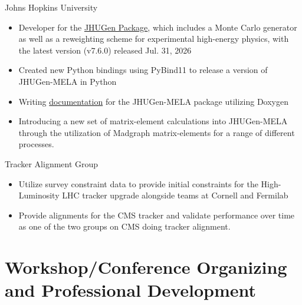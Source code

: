 \documentclass[11pt,english,sans,colorlinks=true,citecolor=black]{moderncv}
\begin{document}
    {Johns Hopkins University}
    {}{}{
        \begin{itemize}
            \item Developer for the \href{https://spin.pha.jhu.edu/}{JHUGen Package},
            which includes a Monte Carlo generator as well as a reweighting scheme
            for experimental high-energy physics, with the latest version
            (v7.6.0) released Jul. 31, 2026
            \item Created new Python bindings using PyBind11 to release a version of
            JHUGen-MELA in Python
            \item Writing \href{https://spin.pha.jhu.edu/MELA/}{documentation} for the JHUGen-MELA
            package utilizing Doxygen
            \item Introducing a new set of matrix-element calculations into JHUGen-MELA
            through the utilization of Madgraph matrix-elements for a range of different processes.
        \end{itemize}
    }

    {Tracker Alignment Group}
    {}{}{
        \begin{itemize}
            \item Utilize survey constraint data to provide initial constraints for the
            High-Luminosity LHC tracker upgrade alongside teams at Cornell
            and Fermilab
            \item Provide alignments for the CMS tracker and validate performance over time
            as one of the two groups on CMS doing tracker alignment.
        \end{itemize}
    }

    \section{Workshop/Conference Organizing and Professional Development}
\end{document}
